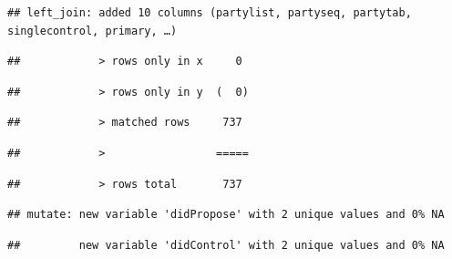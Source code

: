 \documentclass[
]{article}
\newenvironment{Shaded}{\begin{snugshade}}{\end{snugshade}}
\newcommand{\DataTypeTok}[1]{\textcolor[rgb]{0.13,0.29,0.53}{#1}}
\newcommand{\DecValTok}[1]{\textcolor[rgb]{0.00,0.00,0.81}{#1}}
\newcommand{\KeywordTok}[1]{\textcolor[rgb]{0.13,0.29,0.53}{\textbf{#1}}}
\newcommand{\NormalTok}[1]{#1}
\newcommand{\OperatorTok}[1]{\textcolor[rgb]{0.81,0.36,0.00}{\textbf{#1}}}
\newcommand{\StringTok}[1]{\textcolor[rgb]{0.31,0.60,0.02}{#1}}
\begin{document}
\begin{verbatim}
## left_join: added 10 columns (partylist, partyseq, partytab, singlecontrol, primary, …)
\end{verbatim}

\begin{verbatim}
##            > rows only in x     0
\end{verbatim}

\begin{verbatim}
##            > rows only in y  (  0)
\end{verbatim}

\begin{verbatim}
##            > matched rows     737
\end{verbatim}

\begin{verbatim}
##            >                 =====
\end{verbatim}

\begin{verbatim}
##            > rows total       737
\end{verbatim}

\begin{Shaded}
\end{Shaded}

\begin{verbatim}
## mutate: new variable 'didPropose' with 2 unique values and 0% NA
\end{verbatim}

\begin{verbatim}
##         new variable 'didControl' with 2 unique values and 0% NA
\end{verbatim}

\begin{Shaded}
\end{Shaded}
\end{document}

